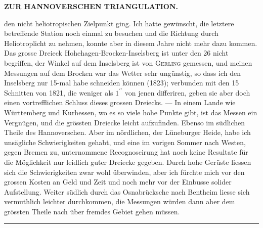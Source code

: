 \clearpage
\noindent\null\hfill{\small\textbf{ZUR HANNOVERSCHEN TRIANGULATION.}}\hfill{}\par\medskip
\noindent den nicht heliotropischen Zielpunkt ging.
Ich hatte gewünscht, die letztere betreffende Station noch einmal zu besuchen und die Richtung durch Heliotroplicht zu nehmen, konnte aber in diesem Jahre nicht mehr dazu kommen.
Das grosse Dreieck Hohehagen-Brocken-Inselsberg ist unter den 26 nicht begriffen, der Winkel auf dem Inselsberg ist von \textsc{Gerling} gemessen, und meinen Messungen auf dem Brocken war das Wetter sehr ungünstig, so dass ich den Inselsberg nur 15-mal habe schneiden können (1823); verbunden mit den 15 Schnitten von 1821, die weniger als \(1^{\prime\prime}\) von jenen differiren, geben sie aber doch einen vortrefflichen Schluss dieses grossen Dreiecks. --- In einem Lande wie Württemberg und Kurhessen, wo es so viele hohe Punkte gibt, ist das Messen ein Vergnügen, und die grössten Dreiecke leicht aufzufinden.
Ebenso im südlichen Theile des Hannoverschen.
Aber im nördlichen, der Lüneburger Heide, habe ich unsägliche Schwierigkeiten gehabt, und eine im vorigen Sommer nach Westen, gegen Bremen zu, unternommene Recognoscirung hat noch keine Resultate für die Möglichkeit nur leidlich guter Dreiecke gegeben.
Durch hohe Gerüste liessen sich die Schwierigkeiten zwar wohl überwinden, aber ich fürchte mich vor den grossen Kosten an Geld und Zeit und noch mehr vor der Einbusse solider Aufstellung.
Weiter südlich durch das Osnabrücksche nach Bentheim liesse sich vermuthlich leichter durchkommen, die Messungen würden dann aber dem grössten Theile nach über fremdes Gebiet gehen müssen.

\begin{center}\rule{.24\textwidth}{.4pt}\end{center}

